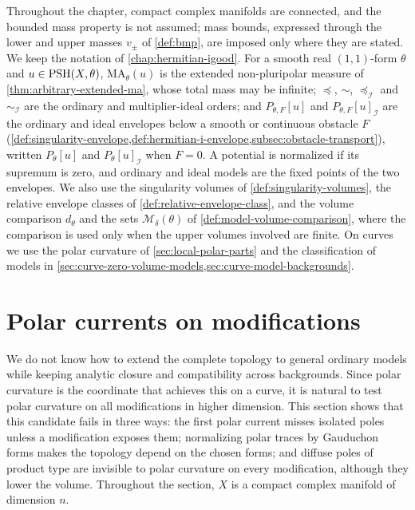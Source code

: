 Throughout the chapter, compact complex manifolds are connected, and the bounded mass property is not assumed; mass bounds, expressed through the lower and upper masses $v_\pm$ of \cref{def:bmp}, are imposed only where they are stated. We keep the notation of \cref{chap:hermitian-igood}. For a smooth real $(1,1)$-form $\theta$ and $u\in\mathrm{PSH}(X,\theta)$, $\mathrm{MA}_\theta(u)$ is the extended non-pluripolar measure of \cref{thm:arbitrary-extended-ma}, whose total mass may be infinite; $\preceq$, $\sim$, $\preceq_{\mathcal I}$ and $\sim_{\mathcal I}$ are the ordinary and multiplier-ideal orders; and $P_{\theta,F}[u]$ and $P_{\theta,F}[u]_{\mathcal I}$ are the ordinary and ideal envelopes below a smooth or continuous obstacle $F$ (\cref{def:singularity-envelope,def:hermitian-i-envelope,subsec:obstacle-transport}), written $P_\theta[u]$ and $P_\theta[u]_{\mathcal I}$ when $F=0$. A potential is normalized if its supremum is zero, and ordinary and ideal models are the fixed points of the two envelopes. We also use the singularity volumes of \cref{def:singularity-volumes}, the relative envelope classes of \cref{def:relative-envelope-class}, and the volume comparison $d_\theta$ and the sets $\mathcal M_\delta(\theta)$ of \cref{def:model-volume-comparison}, where the comparison is used only when the upper volumes involved are finite. On curves we use the polar curvature of \cref{sec:local-polar-parts} and the classification of models in \cref{sec:curve-zero-volume-models,sec:curve-model-backgrounds}.









\section{Polar currents on modifications}
\label{sec:polar-currents-modifications}

We do not know how to extend the complete topology to general ordinary models while keeping analytic closure and compatibility across backgrounds. Since polar curvature is the coordinate that achieves this on a curve, it is natural to test polar curvature on all modifications in higher dimension. This section shows that this candidate fails in three ways: the first polar current misses isolated poles unless a modification exposes them; normalizing polar traces by Gauduchon forms makes the topology depend on the chosen forms; and diffuse poles of product type are invisible to polar curvature on every modification, although they lower the volume. Throughout the section, $X$ is a compact complex manifold of dimension $n$.

